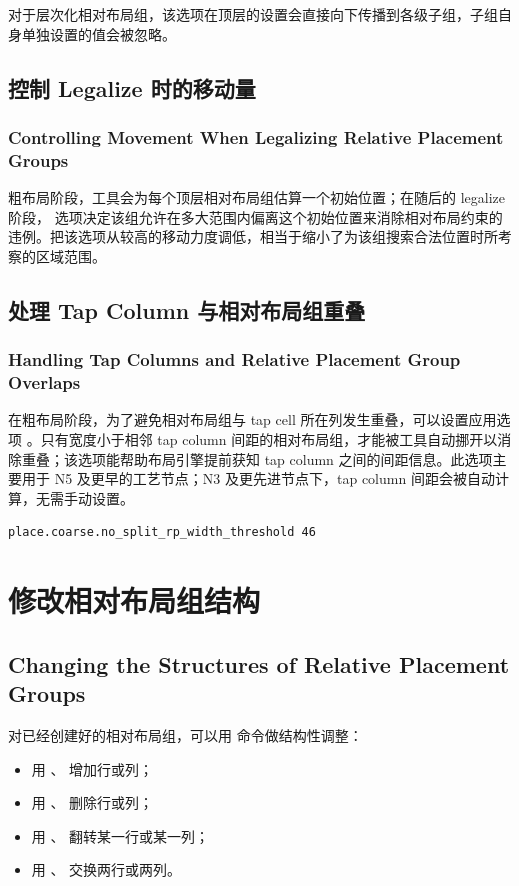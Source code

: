 对于层次化相对布局组，该选项在顶层的设置会直接向下传播到各级子组，子组自身单独设置的值会被忽略。

\subsection{控制 Legalize 时的移动量}
\subsubsection*{Controlling Movement When Legalizing Relative Placement Groups}

粗布局阶段，工具会为每个顶层相对布局组估算一个初始位置；在随后的 legalize 阶段， 选项决定该组允许在多大范围内偏离这个初始位置来消除相对布局约束的违例。把该选项从较高的移动力度调低，相当于缩小了为该组搜索合法位置时所考察的区域范围。

\subsection{处理 Tap Column 与相对布局组重叠}
\subsubsection*{Handling Tap Columns and Relative Placement Group Overlaps}

在粗布局阶段，为了避免相对布局组与 tap cell 所在列发生重叠，可以设置应用选项 。只有宽度小于相邻 tap column 间距的相对布局组，才能被工具自动挪开以消除重叠；该选项能帮助布局引擎提前获知 tap column 之间的间距信息。此选项主要用于 N5 及更早的工艺节点；N3 及更先进节点下，tap column 间距会被自动计算，无需手动设置。

\begin{lstlisting}
place.coarse.no_split_rp_width_threshold 46
\end{lstlisting}

\section{修改相对布局组结构}
\subsection*{Changing the Structures of Relative Placement Groups}

对已经创建好的相对布局组，可以用  命令做结构性调整：
\begin{itemize}
  \item 用 、 增加行或列；
  \item 用 、 删除行或列；
  \item 用 、 翻转某一行或某一列；
  \item 用 、 交换两行或两列。
\end{itemize}

